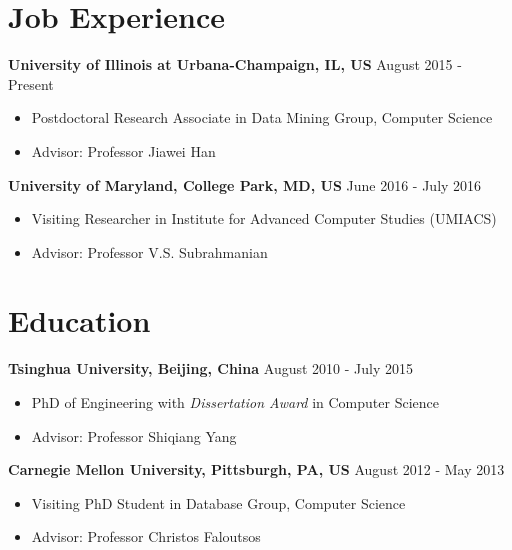 \documentclass[margin, 10pt]{res}
\begin{document}
\begin{resume}

\section{Job Experience}

{\bf University of Illinois at Urbana-Champaign, IL, US} \hfill {August 2015 - Present}
\begin{itemize} \itemsep -2pt
	\item Postdoctoral Research Associate in Data Mining Group, Computer Science
	\item Advisor: Professor Jiawei Han
\end{itemize}

{\bf University of Maryland, College Park, MD, US} \hfill {June 2016 - July 2016}
\begin{itemize} \itemsep -2pt
	\item Visiting Researcher in Institute for Advanced Computer Studies (UMIACS)
	\item Advisor: Professor V.S. Subrahmanian
\end{itemize}


\section{Education}

{\bf Tsinghua University, Beijing, China} \hfill {August 2010 - July 2015}
\begin{itemize} \itemsep -2pt
\item PhD of Engineering with {\em Dissertation Award} in Computer Science
\item Advisor: Professor Shiqiang Yang
\end{itemize}

{\bf Carnegie Mellon University, Pittsburgh, PA, US} \hfill {August 2012 - May 2013}
\begin{itemize} \itemsep -2pt
\item Visiting PhD Student in Database Group, Computer Science
\item Advisor: Professor Christos Faloutsos
\end{itemize}


\end{resume}
\end{document}

